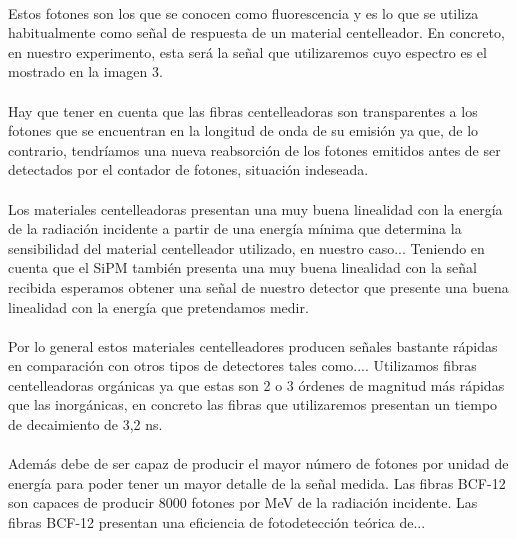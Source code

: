 \paragraph {}
Estos fotones son los que se conocen como fluorescencia y es lo que se utiliza habitualmente como señal de respuesta de un material centelleador. En concreto, en nuestro experimento, esta será la señal que utilizaremos cuyo espectro es el mostrado en la imagen 3.

\paragraph {}
Hay que tener en cuenta que las fibras centelleadoras son transparentes a los fotones que se encuentran en la longitud de onda de su emisión ya que, de lo contrario, tendríamos una nueva reabsorción de los fotones emitidos antes de ser detectados por el contador de fotones, situación indeseada.

\paragraph {}
Los materiales centelleadoras presentan una muy buena linealidad con la energía de la radiación incidente a partir de una energía mínima que determina la sensibilidad del material centelleador utilizado, en nuestro caso... Teniendo en cuenta que el SiPM también presenta una muy buena linealidad con la señal recibida esperamos obtener una señal de nuestro detector que presente una buena linealidad con la energía que pretendamos medir.

\paragraph {}
Por lo general estos materiales centelleadores producen señales bastante rápidas en comparación con otros tipos de detectores tales como.... Utilizamos fibras centelleadoras orgánicas ya que estas son 2 o 3 órdenes de magnitud más rápidas que las inorgánicas,  en concreto las fibras que utilizaremos presentan un tiempo de decaimiento de 3,2 ns. 

\paragraph {}
Además debe de ser capaz de producir el mayor número de fotones por unidad de energía para poder tener un mayor detalle de la señal medida. Las fibras BCF-12 son capaces de producir 8000 fotones por MeV de la radiación incidente. Las fibras BCF-12 presentan una eficiencia de fotodetección teórica de...

